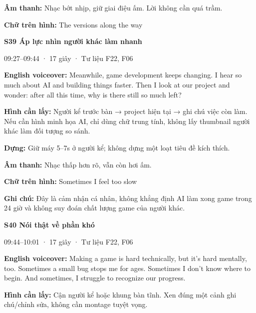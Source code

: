 \documentclass[10pt,a4paper]{article}
\begin{document}
\textbf{Âm thanh:}  Nhạc bớt nhịp, giữ giai điệu ấm. Lời không cần quá trầm.\par

\textbf{Chữ trên hình:}  The versions along the way\par

\textbf{S39 Áp lực nhìn người khác làm nhanh}\par

09:27–09:44 · 17 giây · Tư liệu F22, F06\par

\textbf{English voiceover:}  Meanwhile, game development keeps changing. I hear so much about AI and building things faster. Then I look at our project and wonder: after all this time, why is there still so much left?\par

\textbf{Hình cần lấy:}  Người kể trước bàn → project hiện tại → ghi chú việc còn làm. Nếu cần hình minh họa AI, chỉ dùng chữ trung tính, không lấy thumbnail người khác làm đối tượng so sánh.\par

\textbf{Dựng:}  Giữ máy 5–7s ở người kể; không dựng một loạt tiêu đề kích thích.\par

\textbf{Âm thanh:}  Nhạc thấp hơn rõ, vẫn còn hơi ấm.\par

\textbf{Chữ trên hình:}  Sometimes I feel too slow\par

\textbf{Ghi chú:}  Đây là cảm nhận cá nhân, không khẳng định AI làm xong game trong 24 giờ và không suy đoán chất lượng game của người khác.\par

\clearpage

\textbf{S40 Nói thật về phần khó}\par

09:44–10:01 · 17 giây · Tư liệu F22, F06\par

\textbf{English voiceover:}  Making a game is hard technically, but it’s hard mentally, too. Sometimes a small bug stops me for ages. Sometimes I don’t know where to begin. And sometimes, I struggle to recognize our progress.\par

\textbf{Hình cần lấy:}  Cận người kể hoặc khung bàn tĩnh. Xen đúng một cảnh ghi chú/chỉnh sửa, không cần montage tuyệt vọng.\par
\end{document}
